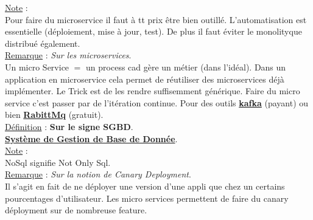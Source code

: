 \documentclass[a4paper,12pt,twoside]{article}
\newcommand{\urlcolor}{magenta}  %
\newcommand{\keycolor}{purple} %
\newcommand{\rem}[2]{\noindent\underline{Remarque} : \textit{#1}.\\ \indent #2}
\newcommand{\note}[1]{\noindent\underline{Note} : \\ \indent #1}
\newcommand{\defi}[2]{\noindent\underline{Définition} : \textbf{#1}.\\ \indent #2}
\newcommand{\keyref}[2]{\hypersetup{urlcolor=\keycolor} \href{#1}{\textbf{#2}}\hypersetup{urlcolor=\urlcolor}}
\begin{document}
\note{Pour faire du microservice il faut à tt prix être bien outillé. L'automatisation est essentielle (déploiement, mise à jour, test). De plus il faut éviter le monolityque distribué également.}\\

\rem{Sur les microservices}{Un micro Service $=$ un process cad gère un métier (dans l'idéal). Dans un application en microservice cela permet de réutiliser des microservices déjà implémenter. Le Trick est de les rendre suffisemment générique. Faire du micro service c'est passer par de l'itération continue. Pour des outils \keyref{https://developer.okta.com/blog/2020/01/22/kafka-microservices}{kafka} (payant) ou bien \keyref{https://www.rabbitmq.com/}{RabittMq} (gratuit).}\\

\defi{Sur le signe SGBD}{\keyref{https://fr.wikipedia.org/wiki/Syst\%C3\%A8me\_de\_gestion\_de\_base\_de\_donn\%C3\%A9es}{Système de Gestion de Base de Donnée}.}\\

\note{NoSql signifie Not Only Sql.}\\

\rem{Sur la notion de Canary Deployment}{Il s'agit en fait de ne déployer une version d'une appli que chez un certains pourcentages d'utilisateur. Les micro services permettent de faire du canary déployment sur de nombreuse feature.}\\

\end{document}
